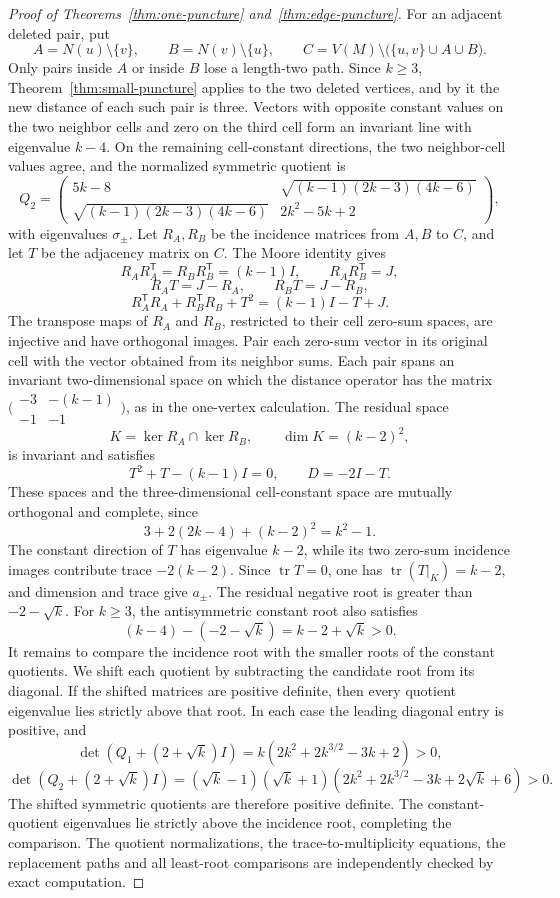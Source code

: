 \documentclass[a4paper,10pt,reqno]{amsart}
\theoremstyle{plain}
\theoremstyle{definition}
\theoremstyle{remark}
\newcommand{\tr}{\operatorname{tr}}
\begin{document}
\begin{proof}[Proof of Theorems~\ref{thm:one-puncture}
and~\ref{thm:edge-puncture}]
For an adjacent deleted pair, put
\[
 A=N(u)\setminus\{v\},\qquad B=N(v)\setminus\{u\},\qquad
 C=V(M)\setminus\bigl(\{u,v\}\cup A\cup B\bigr).
\]
Only pairs inside \(A\) or inside \(B\) lose a length-two path.  Since \(k\ge3\), Theorem~\ref{thm:small-puncture} applies to the
two deleted vertices, and by it the new distance of each such pair is three.
Vectors with opposite constant values on the two neighbor cells and zero
on the third cell form an invariant line with eigenvalue
\(k-4\). On the remaining cell-constant directions, the two neighbor-cell
values agree, and the normalized symmetric quotient is
\[
 Q_2=\begin{pmatrix}
 5k-8&\sqrt{(k-1)(2k-3)(4k-6)}\\
 \sqrt{(k-1)(2k-3)(4k-6)}&2k^2-5k+2
 \end{pmatrix},
\]
with eigenvalues \(\sigma_\pm\).  Let \(R_A,R_B\) be the incidence matrices
from \(A,B\) to \(C\), and let \(T\) be the adjacency matrix on \(C\).  The
Moore identity gives
\[
 R_AR_A^{\mathsf T}=R_BR_B^{\mathsf T}=(k-1)I,\qquad
 R_AR_B^{\mathsf T}=J,
\]
\[
 R_AT=J-R_A,\qquad R_BT=J-R_B,
\]
\[
 R_A^{\mathsf T}R_A+R_B^{\mathsf T}R_B+T^2
 =(k-1)I-T+J.
\]
The transpose maps of \(R_A\) and \(R_B\), restricted to their cell
zero-sum spaces, are injective and have orthogonal images.  Pair each zero-sum vector in its original cell with the vector obtained
from its neighbor sums. Each pair spans an invariant two-dimensional
space on which the distance operator has the matrix
\(\bigl(\begin{smallmatrix}-3&-(k-1)\\-1&-1\end{smallmatrix}\bigr)\),
as in the one-vertex calculation.  The residual space
\[
 K=\ker R_A\cap\ker R_B,\qquad \dim K=(k-2)^2,
\]
is invariant and satisfies
\[
 T^2+T-(k-1)I=0,\qquad D=-2I-T.
\]
These spaces and the three-dimensional cell-constant space are mutually
orthogonal and complete, since
\[
 3+2(2k-4)+(k-2)^2=k^2-1.
\]
The constant direction of \(T\) has eigenvalue \(k-2\), while its two
zero-sum incidence images contribute trace \(-2(k-2)\).  Since
\(\tr T=0\), one has \(\tr(T|_K)=k-2\), and dimension and trace give
\(a_\pm\).  The residual negative root is greater than
\(-2-\sqrt{k}\).  For \(k\ge3\), the antisymmetric constant root also satisfies
\[
 (k-4)-(-2-\sqrt{k})=k-2+\sqrt{k}>0.
\]
It remains to compare the incidence root with the smaller roots of the
constant quotients. We shift each quotient by subtracting the candidate
root from its diagonal. If the shifted matrices are positive definite,
then every quotient eigenvalue lies strictly above that root.  In each case the leading
diagonal entry is positive, and
\[
 \det(Q_1+(2+\sqrt{k})I)
 =k(2k^2+2k^{3/2}-3k+2)>0,
\]
\[
 \det(Q_2+(2+\sqrt{k})I)
 =(\sqrt{k}-1)(\sqrt{k}+1)
 (2k^2+2k^{3/2}-3k+2\sqrt{k}+6)>0.
\]
The shifted symmetric quotients are therefore positive definite.  The
constant-quotient eigenvalues lie strictly above the incidence root,
completing the comparison.
The quotient normalizations, the trace-to-multiplicity equations, the
replacement paths and all least-root comparisons are independently checked
by exact computation.
\end{proof}
\end{document}

